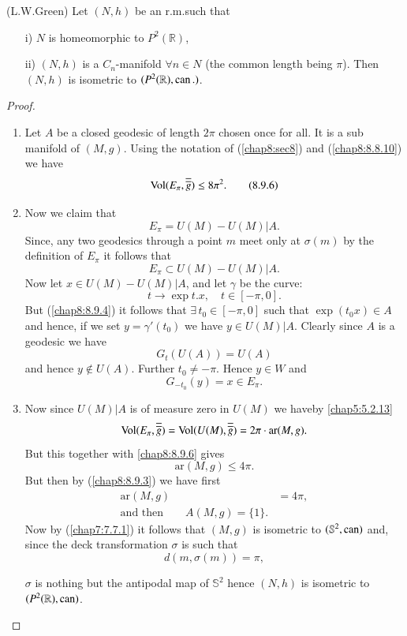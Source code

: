 \begin{theorem*}(L.W.\@ Green)
Let $(N,h)$ be an r.m.\@ such that
\begin{itemize}
\item[\rm i)] $N$ is homeomorphic to $P^{2}(\mathbb{R})$,

\item[\rm ii)] $(N,h)$ is a $C_{n}$-manifold $\forall n\in N$ (the
  common length being $\pi$). Then $(N,h)$ is isometric to
  $(P^{2}(\mathbb{R}),\operatorname{can}.)$. 
\end{itemize}
\end{theorem*}

\begin{proof}
\begin{enumerate}
\renewcommand{\theenumi}{\alph{enumi}}
\renewcommand{\labelenumi}{(\theenumi)}
\item Let \pageoriginale $A$ be a closed geodesic of length $2\pi$
  chosen once for all. It is a sub manifold of $(M,g)$. Using the
  notation of (\ref{chap8:sec8}) and (\ref{chap8:8.8.10}) we have
\begin{equation*}
\operatorname{Vol}(E_{\pi},\overline{\overline{g}})\leq 8\pi^{2}.\tag{8.9.6}\label{chap8:8.9.6}
\end{equation*}

\item Now we claim that
$$
E_{\pi}=U(M)-U(M)|A.
$$
Since, any two geodesics through a point $m$ meet only at $\sigma(m)$
by the definition of $E_{\pi}$ it follows that
$$
E_{\pi}\subset U(M)-U(M)|A.
$$
Now let $x\in U(M)-U(M)|A$, and let $\gamma$ be the curve:
$$
t\to \exp t.x,\quad t\in [-\pi,0].
$$
But (\ref{chap8:8.9.4}) it follows that $\exists\, t_{0}\in [-\pi,0]$
such that $\exp(t_{0}x)\in A$ and hence, if we set $y=\gamma'(t_{0})$
we have $y\in U(M)|A$. Clearly since $A$ is a geodesic we have
$$
G_{t}(U(A))=U(A)
$$
and hence $y\not\in U(A)$. Further $t_{0}\neq -\pi$. Hence $y\in W$
and
$$
G_{-t_{0}}(y)=x\in E_{\pi}.
$$

\item Now since $U(M)|A$ is of measure zero in $U(M)$ we have\break by
  \eqref{chap5:5.2.13}
$$
\operatorname{Vol}(E_{\pi},\overline{\overline{g}})=\operatorname{Vol}(U(M),\overline{\overline{g}})=2\pi\cdot\text{ar}(M,g).
$$
But this together with \eqref{chap8:8.9.6} gives
$$
\text{ar}(M,g)\leq 4\pi.
$$
But then by (\ref{chap8:8.9.3}) we have first
\begin{align*}
\text{ar}(M,g) &= 4\pi,\\
\text{and then}\qquad A(M,g)=\{1\}.
\end{align*}
Now \pageoriginale by (\ref{chap7:7.7.1}) it follows that $(M,g)$ is
isometric to $(\mathbb{S}^{2},\operatorname{can})$ and, since the deck
transformation $\sigma$ is such that
$$
d(m,\sigma(m))=\pi,
$$

$\sigma$ is nothing but the antipodal map of $\mathbb{S}^{2}$ hence
$(N,h)$ is isometric to $(P^{2}(\mathbb{R}),\operatorname{can})$.
\end{enumerate}
\end{proof}

